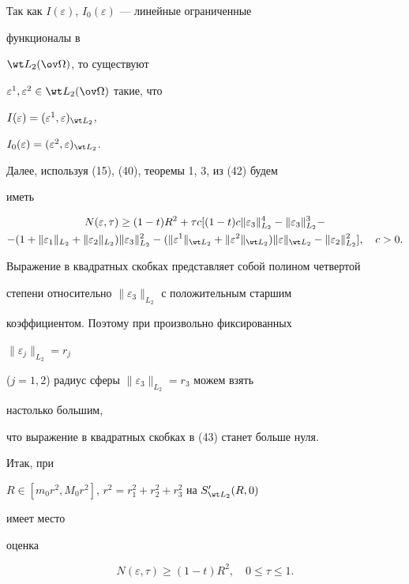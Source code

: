\begin{pf}
Так как $I(\varepsilon)$, $I_0(\varepsilon)$ --- линейные ограниченные 


функционалы в 


$\wt L_2(\ov\Omega)$, то существуют 


$\varepsilon^1,\varepsilon^2\in\wt L_2(\ov\Omega)$ такие, что 


$I(\varepsilon)=(\varepsilon^1,\varepsilon)_{\wt L_2}$, 


$I_0(\varepsilon)=(\varepsilon^2,\varepsilon)_{\wt L_2}$. 


Далее, используя (15), (40), теоремы 1, 3, из (42) будем 


иметь 


\begin{multline} 


N(\varepsilon,\tau)\ge(1-t)R^2+\tau c[(1-t)c 


\|\varepsilon_3\|^4_{L_2}-\|\varepsilon_3\|^3_{L_2}- \\ 


% 


-(1+\|\varepsilon_1\|_{L_2}+\|\varepsilon_2\|_{L_2}) 


\|\varepsilon_3\|^2_{L_2}-(\|\varepsilon^1\|_{\wt L_2}+ 


\|\varepsilon^2\|_{\wt L_2})\|\varepsilon\|_{\wt L_2}- 


\|\varepsilon_2\|^2_{L_2}],\quad c>0. 


\end{multline} 


Выражение в квадратных скобках представляет собой полином четвертой 


степени относительно $\|\varepsilon_3\|_{L_2}$ с положительным старшим 


коэффициентом. Поэтому при произвольно фиксированных 


$\|\varepsilon_j\|_{L_2}=r_j$ 


($j=1,2$) радиус сферы $\|\varepsilon_3\|_{L_2}=r_3$ можем взять 


настолько большим, 


что выражение в квадратных скобках в (43) станет больше нуля. 


Итак, при 


$R\in[m_0r^2,M_0r^2]$, $r^2=r^2_1+r^2_2+r^2_3$ на $S'_{\wt L_2}(R,0)$ 


имеет место 


оценка 


\begin{equation} 


N(\varepsilon,\tau)\ge(1-t)R^2,\quad 0\le\tau\le 1. 



\end{equation}
\end{pf}
